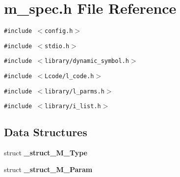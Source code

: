 \section{m\_\-spec.h File Reference}
\label{m__spec_8h}
{\tt \#include $<$config.h$>$}\par
{\tt \#include $<$stdio.h$>$}\par
{\tt \#include $<$library/dynamic\_\-symbol.h$>$}\par
{\tt \#include $<$Lcode/l\_\-code.h$>$}\par
{\tt \#include $<$library/l\_\-parms.h$>$}\par
{\tt \#include $<$library/i\_\-list.h$>$}\par
\subsection*{Data Structures}
\begin{CompactItemize}
\item 
struct \bf{\_\-struct\_\-M\_\-Type}
\item 
struct \bf{\_\-struct\_\-M\_\-Param}
\end{CompactItemize}

